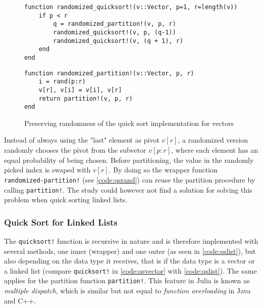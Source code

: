 \documentclass[a4paper, 11pt]{article}
\begin{document}
    \begin{figure}[h]
        \centering
    \begin{verbatim}
function randomized_quicksort!(v::Vector, p=1, r=length(v))
    if p < r
        q = randomized_partition!(v, p, r)    
        randomized_quicksort!(v, p, (q-1))
        randomized_quicksort!(v, (q + 1), r)
    end
end
    \end{verbatim}
    \begin{verbatim}
function randomized_partition!(v::Vector, p, r)
    i = rand(p:r)
    v[r], v[i] = v[i], v[r]
    return partition!(v, p, r)
end
    \end{verbatim}
    \caption{Preserving randomness of the quick sort implementation for vectors}
    \label{code:qsrand} %
    \end{figure}

    Instead of always using the "last" element as pivot $v[r]$, 
    a randomized version randomly chooses the pivot from the 
    subvetor $v[p:r]$, where each element has an equal probability of being
    chosen. Before partitioning, the value in the randomly picked index
    is swaped with $v[r]$. By doing so 
    the wrapper function \texttt{randomized-partition!} 
    (see \autoref{code:qsrand}) can reuse the partition procedure by calling
    \texttt{partition!}.
    The study could however not find a solution for solving this problem
    when quick sorting linked lists.

    \clearpage
    \subsubsection*{Quick Sort for Linked Lists}
    The \texttt{quicksort!} function is recursive in nature and is therefore implemented with 
    several methods, one inner (wrapper) and one outer (as seen in \autoref{code:qslist}), 
    but also depending on the data type it receives, 
    that is if the data type is a vector or a linked list 
    (compare \texttt{quicksort!} in 
    \autoref{code:qsvector} with \autoref{code:qslist}). 
    The same applies for the partition function \texttt{partition!}.
    This feature in Julia is known as \emph{multiple dispatch}, 
    which is similar but not equal to \emph{function overloading} in Java and C++. 
\end{document}
